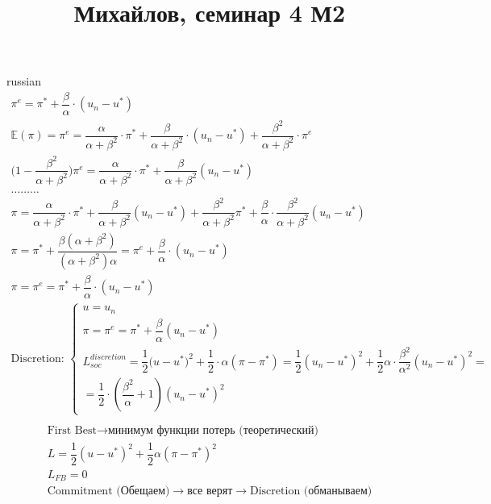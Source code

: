 \documentclass{article}
\begin{document}
\title{\foreignlanguage{russian}{Михайлов, семинар 4 М2}}
\maketitle
\begin{otherlanguage*}{russian}
\begin{align*}
\pi^e = \pi^* + \dfrac{\beta}{\alpha} \cdot (u_n - u^* ) \\
\mathbb{E} ( \pi) = \pi^e = \dfrac{\alpha}{\alpha + \beta ^ 2 } \cdot \pi^* + \dfrac{\beta}{\alpha + \beta^2} \cdot (u_n - u^* ) + \dfrac{\beta^2}{\alpha + \beta ^ 2} \cdot \pi ^ e \\
\Big( 1 - \dfrac{\beta ^ 2 }{\alpha + \beta ^ 2 }\Big) \pi^ e = \dfrac{\alpha }{\alpha + \beta ^ 2 } \cdot \pi^* + \dfrac{\beta}{\alpha + \beta^2} (u_n - u^*) \\
\ldots \ldots \ldots \\
\pi = \dfrac{\alpha }{\alpha + \beta^2} \cdot \pi^* + \dfrac{\beta}{\alpha + \beta^2} ( u_n - u^* ) + \dfrac{\beta ^ 2 }{\alpha + \beta ^ 2} \pi^* + \dfrac{\beta}{\alpha} \cdot \dfrac{\beta ^ 2 }{\alpha + \beta ^ 2} (u_n - u^* ) \\
\pi = \pi^* + \dfrac{\beta (\alpha + \beta^2) }{(\alpha + \beta^2 ) \alpha} = \pi^e + \dfrac{\beta}{\alpha} \cdot (u_n - u^* ) \\
\pi = \pi^e = \pi^* + \dfrac{\beta}{\alpha} \cdot (u_n - u^* ) \\
\text{Discretion: } 
\begin{cases}
u = u_n \\
\pi = \pi^e = \pi^* + \dfrac{\beta}{\alpha} (u_n - u^* ) \\
L^{discretion}_{soc} = \dfrac{1}{2} \Big( u - u^* \Big)^ 2 + \dfrac{1}{2} \cdot \alpha (  \pi - \pi^* ) = \dfrac{1}{2} (u_n - u^*) ^ 2 + \dfrac{1}{2} \alpha \cdot \dfrac{\beta ^ 2 }{\alpha ^ 2 } (u_n - u^* ) ^ 2 = \\ = \dfrac{1 }{2} \cdot ( \dfrac{\beta ^ 2 }{\alpha}  + 1) (u_n - u^* ) ^ 2 
\end{cases} \\
\end{align*}
\begin{align*}
\text{First Best} \rightarrow \text{минимум функции потерь (теоретический) }  \\
L = \dfrac{1}{2} (u - u^* )^ 2 + \dfrac{1}{2} \alpha (\pi - \pi^* ) ^ 2 \\
L_{FB} = 0 \\
\text{Commitment (Обещаем)} \rightarrow \text{все верят} \rightarrow \text{Discretion (обманываем)} \\

\end{align*}
\end{otherlanguage*}
\end{document}
